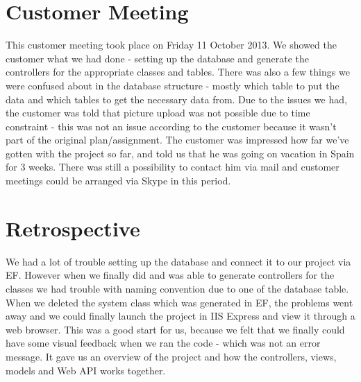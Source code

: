\section{Customer Meeting}
This customer meeting took place on Friday 11 October 2013. We showed the customer what we had done - setting up the database and generate the controllers for the appropriate classes and tables. There was also a few things we were confused about in the database structure - mostly which table to put the data and which tables to get the necessary data from.
Due to the issues we had, the customer was told that picture upload was not possible due to time constraint - this was not an issue according to the customer because it wasn't part of the original plan/assignment.
The customer was impressed how far we've gotten with the project so far, and told us that he was going on vacation in Spain for 3 weeks. There was still a possibility to contact him via mail and customer meetings could be arranged via Skype in this period. 


\section{Retrospective}
We had a lot of trouble setting up the database and connect it to our project via EF. However when we finally did and was able to generate controllers for the classes we had trouble with naming convention due to one of the database table. When we deleted the system class which was generated in EF, the problems went away and we could finally launch the project in IIS Express and view it through a web browser. This was a good start for us, because we felt that we finally could have some visual feedback when we ran the code - which was not an error message. It gave us an overview of the project and how the controllers, views, models and Web API works together.  %